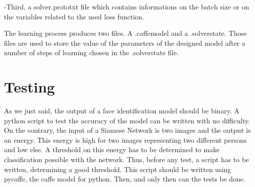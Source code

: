 \FloatBarrier

-Third, a solver.prototxt file which contains informations on the batch size or on the variables related to the used loss function.

The learning process produces two files. A .caffemodel and a .solverstate. Those files are used to store the value of the parameters of the designed model after a number of steps of learning chosen in the .solverstate file.

\section{Testing}

As we just said, the output of a face identification model should be binary. A python script to test the accuracy of the model can be written with no difficulty. On the contrary, the input of a Siamese Network is two images and the output is an energy. This energy is high for two images representing two different persons and low else. A threshold on this energy has to be determined to make classification possible with the network. Thus, before any test, a script has to be written, determining a good threshold. This script should be written using pycaffe, the caffe model for python. Then, and only then can the tests be done.